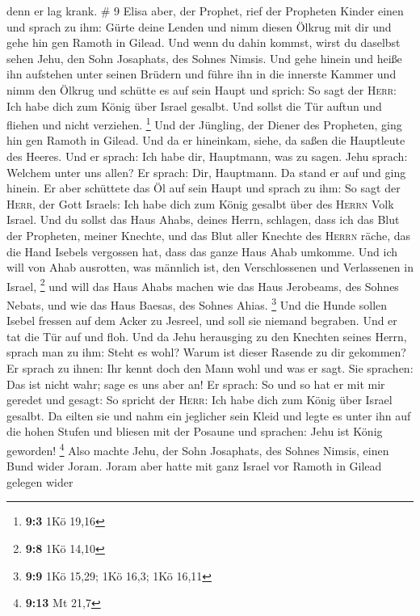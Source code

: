 denn er lag krank. \# 9  Elisa aber, der Prophet, rief der
Propheten Kinder einen und sprach zu ihm: Gürte deine Lenden und nimm
diesen Ölkrug mit dir und gehe hin gen Ramoth in Gilead. 
Und wenn du dahin kommst, wirst du daselbst sehen Jehu, den Sohn
Josaphats, des Sohnes Nimsis. Und gehe hinein und heiße ihn aufstehen
unter seinen Brüdern und führe ihn in die innerste Kammer 
und nimm den Ölkrug und schütte es auf sein Haupt und sprich: So sagt
der \textsc{Herr}: Ich habe dich zum König über Israel gesalbt. Und
sollst die Tür auftun und fliehen und nicht verziehen. \footnote{\textbf{9:3}
  1Kö 19,16}  Und der Jüngling, der Diener des Propheten,
ging hin gen Ramoth in Gilead.  Und da er hineinkam,
siehe, da saßen die Hauptleute des Heeres. Und er sprach: Ich habe dir,
Hauptmann, was zu sagen. Jehu sprach: Welchem unter uns allen? Er
sprach: Dir, Hauptmann.  Da stand er auf und ging hinein.
Er aber schüttete das Öl auf sein Haupt und sprach zu ihm: So sagt der
\textsc{Herr}, der Gott Israels: Ich habe dich zum König gesalbt über
des \textsc{Herrn} Volk Israel.  Und du sollst das Haus
Ahabs, deines Herrn, schlagen, dass ich das Blut der Propheten, meiner
Knechte, und das Blut aller Knechte des \textsc{Herrn} räche, das die
Hand Isebels vergossen hat,  dass das ganze Haus Ahab
umkomme. Und ich will von Ahab ausrotten, was männlich ist, den
Verschlossenen und Verlassenen in Israel, \footnote{\textbf{9:8} 1Kö
  14,10}  und will das Haus Ahabs machen wie das Haus
Jerobeams, des Sohnes Nebats, und wie das Haus Baesas, des Sohnes Ahias.
\footnote{\textbf{9:9} 1Kö 15,29; 1Kö 16,3; 1Kö 16,11} 
Und die Hunde sollen Isebel fressen auf dem Acker zu Jesreel, und soll
sie niemand begraben. Und er tat die Tür auf und floh. 
Und da Jehu herausging zu den Knechten seines Herrn, sprach man zu ihm:
Steht es wohl? Warum ist dieser Rasende zu dir gekommen? Er sprach zu
ihnen: Ihr kennt doch den Mann wohl und was er sagt.  Sie
sprachen: Das ist nicht wahr; sage es uns aber an! Er sprach: So und so
hat er mit mir geredet und gesagt: So spricht der \textsc{Herr}: Ich
habe dich zum König über Israel gesalbt.  Da eilten sie
und nahm ein jeglicher sein Kleid und legte es unter ihn auf die hohen
Stufen und bliesen mit der Posaune und sprachen: Jehu ist König
geworden! \footnote{\textbf{9:13} Mt 21,7}  Also machte
Jehu, der Sohn Josaphats, des Sohnes Nimsis, einen Bund wider Joram.
Joram aber hatte mit ganz Israel vor Ramoth in Gilead gelegen wider

